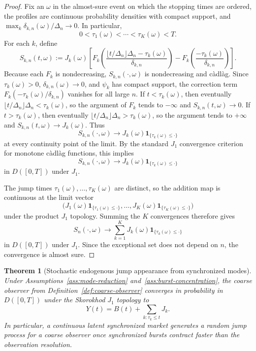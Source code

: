 \documentclass[11pt,a4paper]{amsart}
\theoremstyle{plain}
\newtheorem{theorem}{Theorem}[section]
\theoremstyle{definition}
\theoremstyle{remark}
\newcommand{\one}{\mathbf{1}}
\begin{document}
\begin{proof}
Fix an \(\omega\) in the almost-sure event on which the stopping times are ordered, the profiles
are continuous probability densities with compact support, and
\(\max_k\delta_{k,n}(\omega)/\Delta_n\to0\).  In particular,
\[
        0<\tau_1(\omega)<\cdots<\tau_K(\omega)<T.
\]
For each \(k\), define
\[
        S_{k,n}(t,\omega)
        :=
        J_k(\omega)\left[
        F_k\!\left(\frac{\lfloor t/\Delta_n\rfloor\Delta_n-\tau_k(\omega)}{\delta_{k,n}}\right)
        -
        F_k\!\left(\frac{-\tau_k(\omega)}{\delta_{k,n}}\right)
        \right].
\]
Because each \(F_k\) is nondecreasing, \(S_{k,n}(\cdot,\omega)\) is nondecreasing and
c\`adl\`ag.  Since \(\tau_k(\omega)>0\), \(\delta_{k,n}(\omega)\to0\), and \(\psi_k\) has compact
support, the correction term \(F_k(-\tau_k(\omega)/\delta_{k,n})\) vanishes for all large
\(n\).  If \(t<\tau_k(\omega)\), then eventually
\(\lfloor t/\Delta_n\rfloor\Delta_n<\tau_k(\omega)\), so the argument of \(F_k\) tends to
\(-\infty\) and \(S_{k,n}(t,\omega)\to0\).  If \(t>\tau_k(\omega)\), then eventually
\(\lfloor t/\Delta_n\rfloor\Delta_n>\tau_k(\omega)\), so the argument tends to \(+\infty\) and
\(S_{k,n}(t,\omega)\to J_k(\omega)\).  Thus
\[
        S_{k,n}(\cdot,\omega)\to J_k(\omega)\one_{\{\tau_k(\omega)\le\cdot\}}
\]
at every continuity point of the limit.  By the standard \(J_1\) convergence criterion for
monotone c\`adl\`ag functions, this implies
\[
        S_{k,n}(\cdot,\omega)\to J_k(\omega)\one_{\{\tau_k(\omega)\le\cdot\}}
\]
in \(D([0,T])\) under \(J_1\).

The jump times \(\tau_1(\omega),\dots,\tau_K(\omega)\) are distinct, so the addition map is
continuous at the limit vector
\[
        \bigl(J_1(\omega)\one_{\{\tau_1(\omega)\le\cdot\}},\dots,
        J_K(\omega)\one_{\{\tau_K(\omega)\le\cdot\}}\bigr)
\]
under the product \(J_1\) topology.  Summing the \(K\) convergences therefore gives
\[
        S_n(\cdot,\omega)\to \sum_{k=1}^K J_k(\omega)\one_{\{\tau_k(\omega)\le\cdot\}}
\]
in \(D([0,T])\) under \(J_1\).  Since the exceptional set does not depend on \(n\), the
convergence is almost sure.
\end{proof}

\begin{theorem}[Stochastic endogenous jump appearance from synchronized modes]\label{thm:jump-appearance}
Under Assumptions~\ref{ass:mode-reduction} and~\ref{ass:burst-concentration}, the coarse observer
from Definition~\ref{def:coarse-observer} converges in probability in \(D([0,T])\) under the
Skorokhod \(J_1\) topology to
\[
        Y(t)
        =
        B(t)
        +
        \sum_{k:\tau_k\le t} J_k.
\]
In particular, a continuous latent synchronized market generates a random jump process for a coarse
observer once synchronized bursts contract faster than the observation resolution.
\end{theorem}
\end{document}
